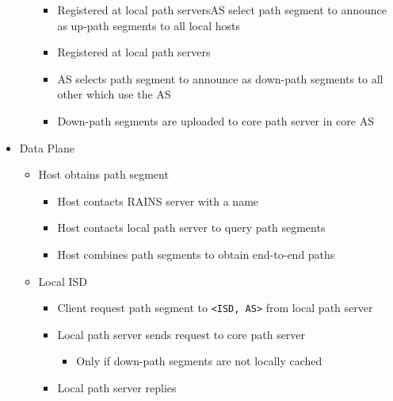 \begin{itemize}
\begin{itemize}
\begin{itemize}
                    \item Registered at local path serversAS select path segment to announce as up-path segments to all local hosts
                    \item Registered at local path servers
                \end{itemize}
                \begin{itemize}
                    \item AS selects path segment to announce as down-path segments to all other which use the AS
                    \item Down-path segments are uploaded to core path server in core AS
                \end{itemize}
        \end{itemize}
    \item Data Plane
        \begin{itemize}
                \begin{itemize}
                    \item Host obtains path segment
                        \begin{itemize}
                            \item Host contacts RAINS server with a name
                            \item Host contacts local path server to query path segments
                            \item Host combines path segments to obtain end-to-end paths
                        \end{itemize}
                    \item Local ISD
                        \begin{itemize}
                            \item Client request path segment to \verb+<ISD, AS>+ from local path server
                            \item Local path server sends request to core path server
                                \begin{itemize}
                                    \item Only if down-path segments are not locally cached
                                \end{itemize}
                            \item Local path server replies
                                \begin{itemize}

\end{itemize}
\end{itemize}
\end{itemize}
\end{itemize}
\end{itemize}
